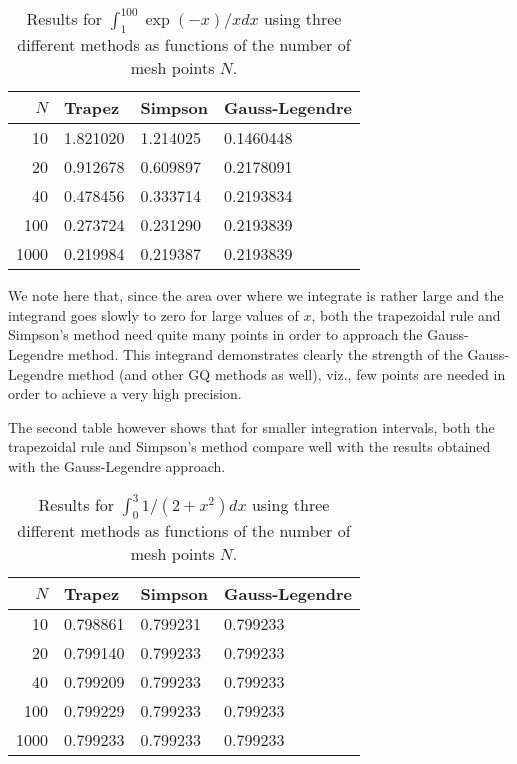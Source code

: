 \begin{table}[hbtp]
\begin{center}
\caption{Results for $\int_1^{100}\exp{(-x)}/xdx$ using three different methods as functions
of the number of mesh points $N$. \label{tab:firstinttable}} 
\begin{tabular}{rlll}\hline
$N$&Trapez&Simpson&Gauss-Legendre\\\hline
10 &  1.821020  &  1.214025  &    0.1460448  \\  
20  &  0.912678  &  0.609897  &    0.2178091  \\
40   & 0.478456  &  0.333714  &  0.2193834   \\
100  & 0.273724   & 0.231290  &  0.2193839 \\
1000 & 0.219984  &  0.219387  &  0.2193839  \\
\hline
\end{tabular} 
\end{center}   
\end{table}     
We note here that, since the area over where we integrate is rather large and the integrand 
goes slowly to zero for large values of $x$, both the trapezoidal rule and Simpson's method
need quite many points in order to approach the Gauss-Legendre method. 
This integrand demonstrates clearly the strength of the Gauss-Legendre method
(and other GQ methods as well), viz., few points
are needed in order to achieve a very high precision.  

The second table however shows that for smaller integration intervals, both the trapezoidal rule
and Simpson's method compare well with the results obtained with the Gauss-Legendre
approach. 
\begin{table}[hbtp]
\begin{center}
\caption{Results for $\int_{0}^{3}1/(2+x^2)dx$ using three different methods as functions
of the number of mesh points $N$. \label{tab:secondinttable}} 
\begin{tabular}{rlll}\hline
$N$&Trapez&Simpson&Gauss-Legendre\\\hline
10  &  0.798861  &  0.799231  &  0.799233 \\  
20   & 0.799140  &  0.799233  &  0.799233 \\
40  &  0.799209   & 0.799233  &  0.799233 \\
100  & 0.799229  &  0.799233   & 0.799233 \\  
1000 & 0.799233  &  0.799233  &  0.799233 \\
\hline
\end{tabular} 
\end{center}   
\end{table}     



